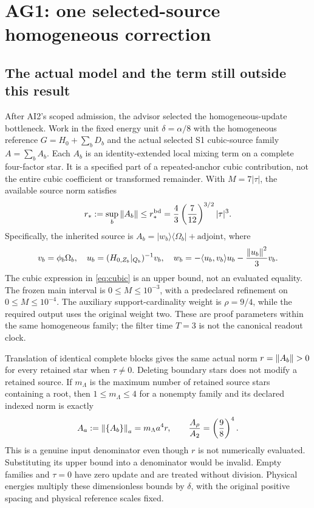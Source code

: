 \section{AG1: one selected-source homogeneous correction\workstar}
\subsection{The actual model and the term still outside this result}
After AI2's scoped admission, the advisor selected the homogeneous-update bottleneck. Work in the fixed energy unit $\delta=\alpha/8$ with the homogeneous reference
$G=H_0+\sum_bD_b$ and the actual selected S1 cubic-source family $A=\sum_b A_b$. Each $A_b$ is an identity-extended local mixing term on a complete four-factor star. It is a specified part of a repeated-anchor cubic contribution, not the entire cubic coefficient or transformed remainder. With $M=7|\tau|$, the available source norm satisfies
\begin{equation}
r_*:=\sup_b\left\lVert A_b\right\rVert\le r_*^{\rm bd}
=\frac43\left(\frac7{12}\right)^{3/2}|\tau|^3.
\label{eq:cubic}
\end{equation}
Specifically, the inherited source is $A_b=|w_b\rangle\langle\Omega_b|+\mathrm{adjoint}$, where
\begin{equation}
v_b=\phi_b\Omega_b,\quad u_b=(H_{0,Z_b}|_{Q_b})^{-1}v_b,\quad
w_b=-\langle u_b,v_b\rangle u_b-\frac{\left\lVert u_b\right\rVert^2}{3}v_b.
\label{eq:actualsource}
\end{equation}
The cubic expression in \eqref{eq:cubic} is an upper bound, not an evaluated equality. The frozen main interval is $0\le M\le10^{-3}$, with a predeclared refinement on $0\le M\le10^{-4}$. The auxiliary support-cardinality weight is $\rho=9/4$, while the required output uses the original weight two. These are proof parameters within the same homogeneous family; the filter time $T=3$ is not the canonical readout clock.

Translation of identical complete blocks gives the same actual norm $r=\left\lVert A_b\right\rVert>0$ for every retained star when $\tau\ne0$. Deleting boundary stars does not modify a retained source. If $m_\Lambda$ is the maximum number of retained source stars containing a root, then $1\le m_\Lambda\le4$ for a nonempty family and its declared indexed norm is exactly
\begin{equation}
A_a:=\left\lVert\{A_b\}\right\rVert_a=m_\Lambda a^4r,\qquad
\frac{A_\rho}{A_2}=\left(\frac98\right)^4.
\label{eq:denominator}
\end{equation}
This is a genuine input denominator even though $r$ is not numerically evaluated. Substituting its upper bound into a denominator would be invalid. Empty families and $\tau=0$ have zero update and are treated without division. Physical energies multiply these dimensionless bounds by $\delta$, with the original positive spacing and physical reference scales fixed.

